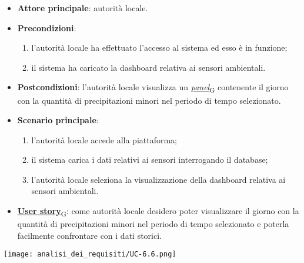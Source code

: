\begin{itemize}
	\item \textbf{Attore principale}: autorità locale.
	\item \textbf{Precondizioni}:
	      \begin{enumerate}
		      \item l'autorità locale ha effettuato l'accesso al sistema ed esso è in funzione;
		      \item il sistema ha caricato la dashboard relativa ai sensori ambientali.
	      \end{enumerate}
	\item \textbf{Postcondizioni}: l'autorità locale visualizza un \href{https://7last.github.io/docs/pb/documentazione-interna/glossario\#panel}{\textit{panel}\textsubscript{G}} contenente il giorno con la quantità di precipitazioni minori nel periodo di tempo selezionato.
	\item \textbf{Scenario principale}:
	      \begin{enumerate}
		      \item l'autorità locale accede alla piattaforma;
		      \item il sistema carica i dati relativi ai sensori interrogando il database;
		      \item l'autorità locale seleziona la visualizzazione della dashboard relativa ai sensori ambientali.
	      \end{enumerate}
	\item \href{https://7last.github.io/docs/pb/documentazione-interna/glossario\#user-story}{\textbf{User story}\textsubscript{G}}:
	      come autorità locale desidero poter visualizzare il giorno con la quantità di precipitazioni minori nel periodo di tempo selezionato
	      e poterla facilmente confrontare con i dati storici.
\end{itemize}
\begin{center}
	\texttt{[image: analisi\_dei\_requisiti/UC-6.6.png]}
\end{center}


